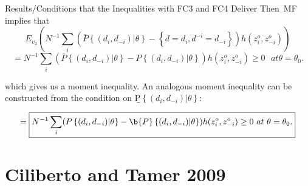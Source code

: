 \documentclass[aspectratio=169,11pt]{beamer}
\begin{document}
\begin{frame}{\normalsize Results/Conditions that the Inequalities with FC3 and FC4 Deliver}
 Then\ MF implies that%
\begin{equation*}
E_{\upsilon _{2}}(N^{-1}\sum_{i}(\bar{P}\left\{ (d_{i},d_{-i})|\theta
\right\} -\left\{ d=d_{i},d^{-i}=d_{-i}\right\} )h(z_{i}^{o},z_{-i}^{o}))
\end{equation*}%
\begin{equation*}
=\boxed{N^{-1}\sum_{i}(\bar{P}\left\{ (d_{i},d_{-i})|\theta \right\} -P\left\{
(d_{i},d_{-i})|\theta \right\} )h(z_{i}^{o},z_{-i}^{o})\geq 0\text{ }at\text{
}\theta =\theta _{0}\text{.}}
\end{equation*}

which gives us a moment inequality. An analogous moment inequality can be
constructed from the condition on \b{P}$\left\{ (d_{i},d_{-i})|\theta
\right\}$:

\begin{equation*}
=\boxed{N^{-1}\sum_{i}(P\left\{(d_{i},d_{-i})|\theta \right\} - \b{P}\left\{ (d_{i},d_{-i})|\theta \right\})
h(z_{i}^{o},z_{-i}^{o})\geq 0\text{ }at\text{
}\theta =\theta _{0}\text{.}}
\end{equation*}
\end{frame}


\section{Ciliberto and Tamer 2009}
\end{document}

